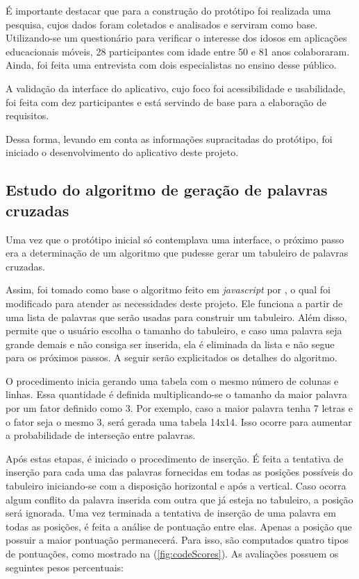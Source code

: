 É importante destacar que para a construção do protótipo foi realizada uma pesquisa, cujos dados foram coletados e analisados e serviram como base.
Utilizando-se um questionário para verificar o interesse dos idosos em aplicações educacionais móveis, 28 participantes com idade entre 50 e 81 anos colaboraram. Ainda, foi feita uma entrevista com dois especialistas no ensino desse público.

A validação da interface do aplicativo, cujo foco foi acessibilidade e usabilidade, foi feita com dez participantes e está servindo de base para a elaboração de requisitos. 

Dessa forma, levando em conta as informações supracitadas do protótipo, foi iniciado o desenvolvimento do aplicativo deste projeto.

\subsection{Estudo do algoritmo de geração de palavras cruzadas}
Uma vez que o protótipo inicial só contemplava uma interface, o próximo passo era a determinação de um algoritmo que pudesse gerar um tabuleiro de palavras cruzadas. 

Assim, foi tomado como base o algoritmo feito em \textit{javascript} por \cite{layoutGenerator}, o qual foi modificado para atender as necessidades deste projeto. Ele funciona a partir de uma lista de palavras que serão usadas para construir um tabuleiro. Além disso, permite que o usuário escolha o tamanho do tabuleiro, e caso uma palavra seja grande demais e não consiga ser inserida, ela é eliminada da lista e não segue para os próximos passos. A seguir serão explicitados os detalhes do algoritmo.

O procedimento inicia gerando uma tabela com o mesmo número de colunas e linhas. Essa quantidade é definida multiplicando-se o tamanho da maior palavra por um fator definido como 3. Por exemplo, caso a maior palavra tenha 7 letras e o fator seja o mesmo 3, será gerada uma tabela 14x14. Isso ocorre para aumentar a probabilidade de interseção entre palavras. 

Após estas etapas, é iniciado o procedimento de inserção. É feita a tentativa de inserção para cada uma das palavras fornecidas em todas as posições possíveis do tabuleiro iniciando-se com a disposição horizontal e após a vertical. Caso ocorra algum conflito da palavra inserida com outra que já esteja no tabuleiro, a posição será ignorada. Uma vez terminada a tentativa de inserção de uma palavra em todas as posições, é feita a análise de pontuação entre elas. Apenas a posição que possuir a maior pontuação permanecerá. Para isso, são computados quatro tipos de pontuações, como mostrado na (\autoref{fig:codeScores}). As avaliações possuem os seguintes pesos percentuais:


